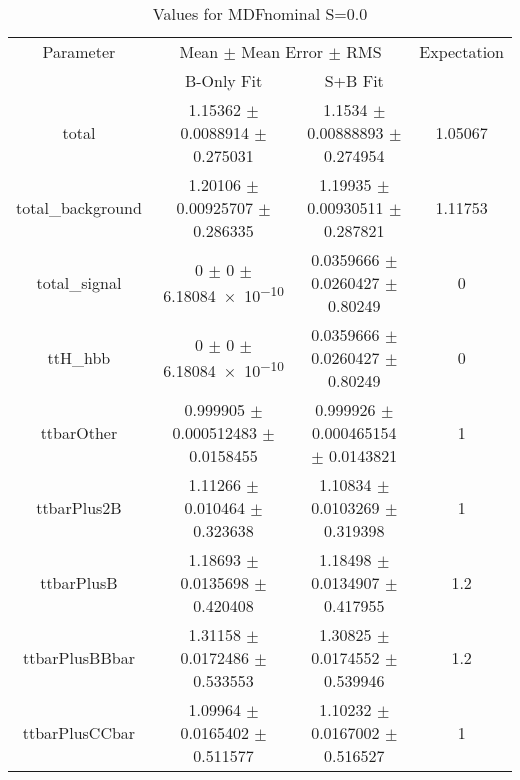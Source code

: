 \begin{table}
\centering
\caption{Values for MDFnominal S=0.0}
\begin{tabular}{cccc}
\toprule
Parameter & \multicolumn{2}{c}{Mean $\pm$ Mean Error $\pm$ RMS} & Expectation\\
 & B-Only Fit & S+B Fit & \\
\midrule
total & \num{1.15362} $\pm$ \num{0.0088914} $\pm$ \num{0.275031} & \num{1.1534} $\pm$ \num{0.00888893} $\pm$ \num{0.274954} & \num{1.05067}\\
total\_background & \num{1.20106} $\pm$ \num{0.00925707} $\pm$ \num{0.286335} & \num{1.19935} $\pm$ \num{0.00930511} $\pm$ \num{0.287821} & \num{1.11753}\\
total\_signal & \num{0} $\pm$ \num{0} $\pm$ \num{6.18084e-10} & \num{0.0359666} $\pm$ \num{0.0260427} $\pm$ \num{0.80249} & \num{0}\\
ttH\_hbb & \num{0} $\pm$ \num{0} $\pm$ \num{6.18084e-10} & \num{0.0359666} $\pm$ \num{0.0260427} $\pm$ \num{0.80249} & \num{0}\\
ttbarOther & \num{0.999905} $\pm$ \num{0.000512483} $\pm$ \num{0.0158455} & \num{0.999926} $\pm$ \num{0.000465154} $\pm$ \num{0.0143821} & \num{1}\\
ttbarPlus2B & \num{1.11266} $\pm$ \num{0.010464} $\pm$ \num{0.323638} & \num{1.10834} $\pm$ \num{0.0103269} $\pm$ \num{0.319398} & \num{1}\\
ttbarPlusB & \num{1.18693} $\pm$ \num{0.0135698} $\pm$ \num{0.420408} & \num{1.18498} $\pm$ \num{0.0134907} $\pm$ \num{0.417955} & \num{1.2}\\
ttbarPlusBBbar & \num{1.31158} $\pm$ \num{0.0172486} $\pm$ \num{0.533553} & \num{1.30825} $\pm$ \num{0.0174552} $\pm$ \num{0.539946} & \num{1.2}\\
ttbarPlusCCbar & \num{1.09964} $\pm$ \num{0.0165402} $\pm$ \num{0.511577} & \num{1.10232} $\pm$ \num{0.0167002} $\pm$ \num{0.516527} & \num{1}\\
\bottomrule
\end{tabular}
\end{table}